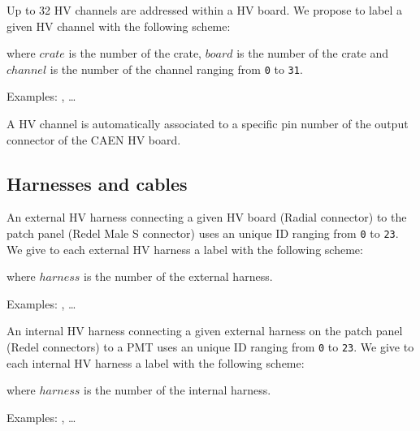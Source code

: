 \vskip 10pt
\par\noindent Up  to 32 HV channels are addressed within a HV board.
 We propose to label a given HV channel with the following scheme:
\begin{center}
 \end{center}
where \texttt{$crate$} is the number of the crate,
  \texttt{$board$} is the number of the crate
and  \texttt{$channel$} is the number of the channel
ranging from
\texttt{0} to \texttt{31}.
\par\noindent Examples: , \dots
{}

\vskip 10pt
A HV channel is automatically associated to a specific pin number of
the output connector of the CAEN HV board. 

\subsection{Harnesses and cables}

\vskip 10pt An external HV  harness  connecting a given HV board (Radial
connector) to the patch panel (Redel  Male S connector) uses an unique
ID  ranging from  \texttt{0} to  \texttt{23}.  We give to each
external HV harness a label with the following scheme:
\begin{center}
 \end{center}
where \texttt{$harness$} is the number of the external harness.
\par\noindent Examples: , \dots
{}

\vskip 10pt An internal HV  harness  connecting a given external harness on the patch panel (Redel
connectors) to a PMT uses an unique
ID  ranging from  \texttt{0} to  \texttt{23}.  We give to each
internal HV harness a label with the following scheme:
\begin{center}
 \end{center}
where \texttt{$harness$} is the number of the internal harness.
\par\noindent Examples: , \dots
{}

